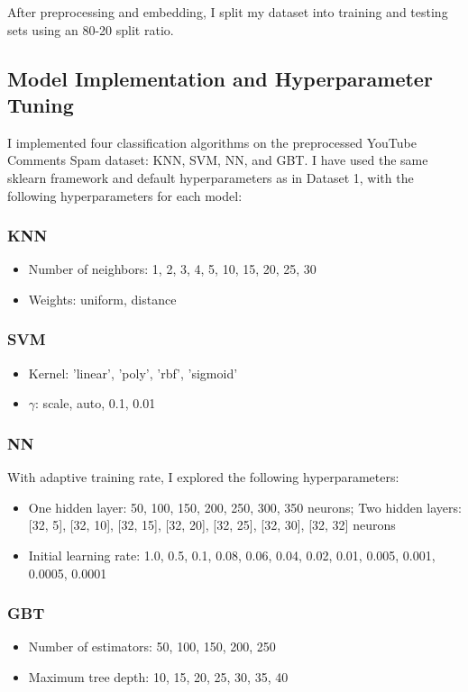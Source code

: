\documentclass[conference]{IEEEtran}
\begin{document}
After preprocessing and embedding, I split my dataset into training and testing sets using an 80-20 split ratio.

\subsection{Model Implementation and Hyperparameter Tuning \label{sec:data2-hyperparameter}}
I implemented four classification algorithms on the preprocessed YouTube Comments Spam dataset: KNN, SVM, NN, and GBT. I have used the same sklearn framework and default hyperparameters as in Dataset 1, with the following hyperparameters for each model:
\subsubsection{KNN}
\begin{itemize}
    \item Number of neighbors: 1, 2, 3, 4, 5, 10, 15, 20, 25, 30
    \item Weights: uniform, distance
\end{itemize}
\subsubsection{SVM}
\begin{itemize}
    \item Kernel: 'linear', 'poly', 'rbf', 'sigmoid'
    \item $\gamma$: scale, auto, 0.1, 0.01
\end{itemize}
\subsubsection{NN}
With adaptive training rate, I explored the following hyperparameters:
\begin{itemize}
    \item One hidden layer: 50, 100, 150, 200, 250, 300, 350 neurons; Two hidden layers: [32, 5], [32, 10], [32, 15], [32, 20], [32, 25], [32, 30], [32, 32] neurons
    \item Initial learning rate: 1.0, 0.5, 0.1, 0.08, 0.06, 0.04, 0.02, 0.01, 0.005, 0.001, 0.0005, 0.0001
\end{itemize}
\subsubsection{GBT}
\begin{itemize}
    \item Number of estimators: 50, 100, 150, 200, 250
    \item Maximum tree depth: 10, 15, 20, 25, 30, 35, 40
\end{itemize}
\end{document}
